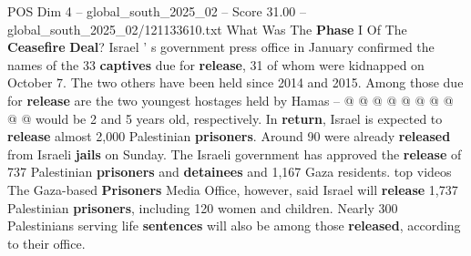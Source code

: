 \begin{textsample}{POS Dim 4 – global\_south\_2025\_02 – Score 31.00 – global\_south\_2025\_02/121133610.txt}
What Was The \textbf{Phase} I Of The \textbf{Ceasefire} \textbf{Deal}?
Israel ' s government press office in January confirmed the names of the 33 \textbf{captives} due for \textbf{release}, 31 of whom were kidnapped on October 7.
The two others have been held since 2014 and 2015.
Among those due for \textbf{release} are the two youngest hostages held by Hamas -- @ @ @ @ @ @ @ @ @ @ would be 2 and 5 years old, respectively.
In \textbf{return}, Israel is expected to \textbf{release} almost 2,000 Palestinian \textbf{prisoners}.
Around 90 were already \textbf{released} from Israeli \textbf{jails} on Sunday.
The Israeli government has approved the \textbf{release} of 737 Palestinian \textbf{prisoners} and \textbf{detainees} and 1,167 Gaza residents. top videos The Gaza-based \textbf{Prisoners} Media Office, however, said Israel will \textbf{release} 1,737 Palestinian \textbf{prisoners}, including 120 women and children.
Nearly 300 Palestinians serving life \textbf{sentences} will also be among those \textbf{released}, according to their office.

\end{textsample}
